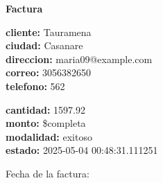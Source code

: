 \documentclass{article}
\begin{document}
\begin{center}
    {\LARGE \textbf{Factura}}\\[1cm]
\end{center}

\textbf{cliente:} Tauramena \\
\textbf{ciudad:} Casanare \\
\textbf{direccion:} maria09@example.com \\
\textbf{correo:} 3056382650 \\
\textbf{telefono:} 562 \\

\vspace{0.5cm}

\textbf{cantidad:} 1597.92 \\
\textbf{monto:} \$completa \\
\textbf{modalidad:} exitoso \\
\textbf{estado:} 2025-05-04 00:48:31.111251 \\

\vspace{1cm}

Fecha de la factura: 
\end{document}
